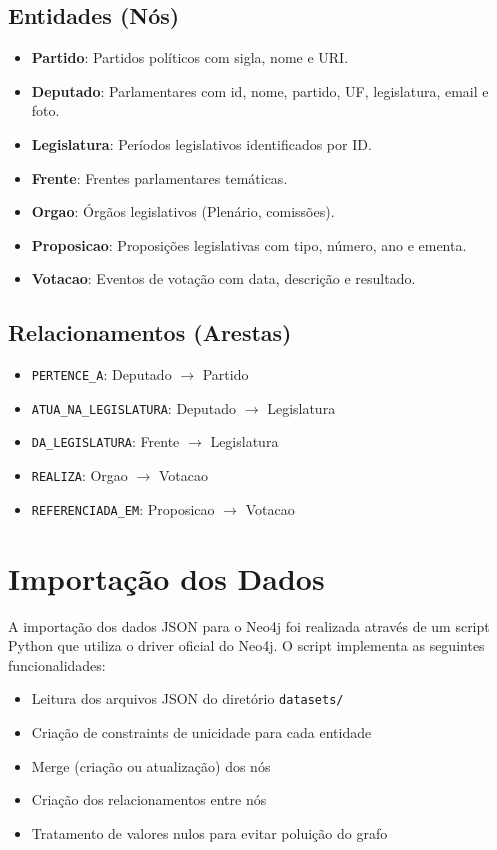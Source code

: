 \documentclass[12pt,a4paper]{article}
\begin{document}
\subsection{Entidades (Nós)}

\begin{itemize}
    \item \textbf{Partido}: Partidos políticos com sigla, nome e URI.
    \item \textbf{Deputado}: Parlamentares com id, nome, partido, UF, legislatura, email e foto.
    \item \textbf{Legislatura}: Períodos legislativos identificados por ID.
    \item \textbf{Frente}: Frentes parlamentares temáticas.
    \item \textbf{Orgao}: Órgãos legislativos (Plenário, comissões).
    \item \textbf{Proposicao}: Proposições legislativas com tipo, número, ano e ementa.
    \item \textbf{Votacao}: Eventos de votação com data, descrição e resultado.
\end{itemize}

\subsection{Relacionamentos (Arestas)}

\begin{itemize}
    \item \texttt{PERTENCE\_A}: Deputado $\rightarrow$ Partido
    \item \texttt{ATUA\_NA\_LEGISLATURA}: Deputado $\rightarrow$ Legislatura
    \item \texttt{DA\_LEGISLATURA}: Frente $\rightarrow$ Legislatura
    \item \texttt{REALIZA}: Orgao $\rightarrow$ Votacao
    \item \texttt{REFERENCIADA\_EM}: Proposicao $\rightarrow$ Votacao
\end{itemize}

\section{Importação dos Dados}

A importação dos dados JSON para o Neo4j foi realizada através de um script Python que utiliza o driver oficial do Neo4j. O script implementa as seguintes funcionalidades:

\begin{itemize}
    \item Leitura dos arquivos JSON do diretório \texttt{datasets/}
    \item Criação de constraints de unicidade para cada entidade
    \item Merge (criação ou atualização) dos nós
    \item Criação dos relacionamentos entre nós
    \item Tratamento de valores nulos para evitar poluição do grafo
\end{itemize}
\end{document}
